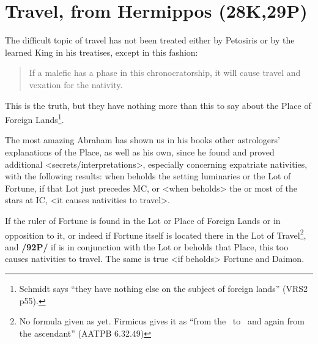 \section{Travel, from Hermippos (28K,29P)}

The difficult topic of travel has not been treated either by Petosiris or by the learned King in his treatises, except in this fashion: \begin{quote}If a malefic has a phase in this chronocratorship, it will cause travel and vexation for the nativity.\end{quote} This is the truth, but they have nothing more than this to say about the Place of Foreign Lands\footnote{Schmidt says ``they have nothing else on the subject of foreign lands'' (VRS2 p55).}. 

The most amazing Abraham has shown us in his books other astrologers’ explanations of the Place, as well as his own, since he found and proved additional <secrets/interpretations>, especially concerning expatriate nativities, with the following results: when \Mars\xspace beholds the setting luminaries or the Lot of Fortune, if that Lot just precedes MC, or <when \Mars\xspace beholds> the \Moon\xspace or most of the stars at IC, <it causes nativities to travel>. 

If the ruler of Fortune is found in the Lot or Place of Foreign Lands or in opposition to it, or indeed if Fortune itself is located there in the Lot of Travel\footnote{No formula given as yet. Firmicus gives it as ``from the \Sun\, to \Mars\, and again from the ascendant'' (AATPB 6.32.49) }, and \textbf{/92P/} if \Mars\xspace is in conjunction with the Lot or beholds that Place, this too causes nativities to travel. The same is true <if \Mars\xspace beholds> Fortune and Daimon.


\newpage